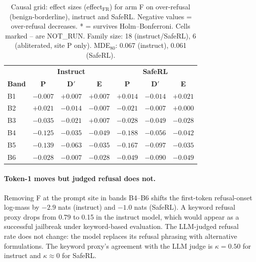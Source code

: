 \documentclass[11pt,letterpaper]{article}
\begin{document}
\begin{table}[!htbp]
\centering
\scriptsize
\caption{Causal grid: effect sizes (effect$_\text{FR}$) for arm F on over-refusal (benign-borderline), instruct and SafeRL. Negative values = over-refusal decreases. * = survives Holm--Bonferroni. Cells marked -- are NOT\_RUN. Family size: 18 (instruct/SafeRL), 6 (abliterated, site P only). MDE$_{80}$: 0.067 (instruct), 0.061 (SafeRL).}
\label{tab:causal}
\begin{tabular}{l|ccc|ccc}
\toprule
 & \multicolumn{3}{c|}{\textbf{Instruct}} & \multicolumn{3}{c}{\textbf{SafeRL}} \\
\textbf{Band} & \textbf{P} & \textbf{D$'$} & \textbf{E} & \textbf{P} & \textbf{D$'$} & \textbf{E} \\
\midrule
B1 & $-0.007$ & $+0.007$ & $+0.007$ & $+0.014$ & $-0.014$ & $+0.021$ \\
B2 & $+0.021$ & $-0.014$ & $-0.007$ & $-0.021$ & $-0.007$ & $+0.000$ \\
B3 & $-0.035$ & $-0.021$ & $+0.007$ & $-0.028$ & $-0.049$ & $-0.028$ \\
B4 & $-0.125$ & $-0.035$ & $-0.049$ & $\mathbf{-0.188}$ & $-0.056$ & $-0.042$ \\
B5 & $-0.139$ & $-0.063$ & $-0.035$ & $\mathbf{-0.167}$ & $-0.097$ & $-0.035$ \\
B6 & $-0.028$ & $-0.007$ & $-0.028$ & $-0.049$ & $-0.090$ & $-0.049$ \\
\bottomrule
\end{tabular}
\end{table}

\paragraph{Token-1 moves but judged refusal does not.}
Removing F at the prompt site in bands B4--B6 shifts the first-token refusal-onset log-mass by $-2.9$ nats (instruct) and $-1.0$ nats (SafeRL). A keyword refusal proxy drops from 0.79 to 0.15 in the instruct model, which would appear as a successful jailbreak under keyword-based evaluation. The LLM-judged refusal rate does not change: the model replaces its refusal phrasing with alternative formulations. The keyword proxy's agreement with the LLM judge is $\kappa = 0.50$ for instruct and $\kappa \approx 0$ for SafeRL.
\end{document}
